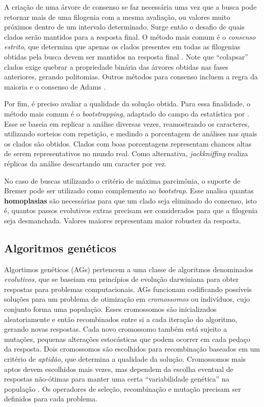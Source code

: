 \documentclass[12pt]{article}
\begin{document}
A criação de uma árvore de consenso se faz necessária uma vez que a busca pode retornar mais de uma filogenia com a mesma avaliação, ou valores muito próximos dentro de um intervalo determinado. Surge então o desafio de quais clados serão mantidos para a resposta final. O método mais comum é o \emph{consenso estrito}, que determina que apenas os clados presentes em todas as filogenias obtidas pela busca devem ser mantidos na resposta final \cite{felsenstein2004inferring}. Note que ``colapsar'' clados exige quebrar a propriedade binária das árvores obtidas nas fases anteriores, gerando politomias. Outros métodos para consenso incluem a regra da maioria \cite{majority-rule} e o consenso de Adams \cite{adams}.

Por fim, é preciso avaliar a qualidade da solução obtida. Para essa finalidade, o método mais comum é o \emph{bootstrapping}, adaptado do campo da estatística por \cite{bootstrap}. Esse se baseia em replicar a análise diversas vezes, reamostrando os caracteres, utilizando sorteios com repetição, e medindo a porcentagem de análises nas quais os clados são obtidos. Clados com boas porcentagens representam chances altas de serem representativos no mundo real. Como alternativa, \emph{jackkniffing} realiza réplicas da análise descartando um caracter por vez.

No caso de buscas utilizando o critério de máxima parcimônia, o suporte de Bremer \cite{bremer-support} pode ser utilizado como complemento ao \emph{bootstrap}. Esse analisa quantas \textbf{homoplasias} são necessárias para que um clado seja eliminado do consenso, isto é, quantos passos evolutivos extras precisam ser considerados para que a filogenia seja desmanchada. Valores maiores representam maior robustez da resposta.

\subsection{Algoritmos genéticos}

Algortimos genéticos (AGs) pertencem a uma classe de algoritmos denominados \emph{evolutivos}, que se baseiam em princípios de evolução darwiniana para obter respostas para problemas computacionais. AGs funcionam codificando possíveis soluções para um problema de otimização em \emph{cromossomos} ou indivíduos, cujo conjunto forma uma população. Esses cromossomos são inicializados aleatoriamente e então recombinados entre si a cada iteração do algoritmo, gerando novas respostas. Cada novo cromossomo também está sujeito a mutações, pequenas alterações estocásticas que podem ocorrer em cada pedaço da resposta. Dois cromossomos são escolhidos para recombinação baseados em um critério de \emph{aptidão}, que determina a qualidade da solução. Cromossomos mais aptos devem escolhidos mais vezes, mas dependem da escolha eventual de respostas não-ótimas para manter uma certa ``variabilidade genética'' na população \cite{garli}. Os operadores de seleção, recombinação e mutação precisam ser definidos para cada problema.
\end{document}

